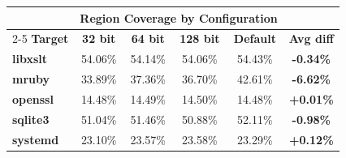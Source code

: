 \begin{table}[htbp]
    \centering
    \footnotesize
    \begin{tabular}{@{}l ccccc @{}}
        \toprule
        & \multicolumn{4}{c}{\textbf{Region Coverage by Configuration}} \\
        \cmidrule(l){2-5}
        \textbf{Target} & \textbf{32 bit} & \textbf{64 bit} & \textbf{128 bit} & \textbf{Default} & \textbf{Avg diff} \\
        \midrule
        \textbf{libxslt} & 54.06\% & 54.14\% & 54.06\% & 54.43\% & \textbf{-0.34\%} \\
        \textbf{mruby}   & 33.89\% & 37.36\% & 36.70\% & 42.61\% & \textbf{-6.62\%} \\
        \textbf{openssl} & 14.48\% & 14.49\% & 14.50\% & 14.48\% & \textbf{+0.01\%} \\
        \textbf{sqlite3} & 51.04\% & 51.46\% & 50.88\% & 52.11\% & \textbf{-0.98\%} \\
        \textbf{systemd} & 23.10\% & 23.57\% & 23.58\% & 23.29\% & \textbf{+0.12\%} \\
        \bottomrule
    \end{tabular}
\end{table}
